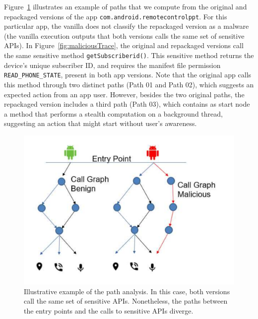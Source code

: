 Figure~\ref{fig:callGraph} illustrates an example of paths that we compute from the original and
repackaged versions of the app \texttt{com.android.remotecontrolppt}.
For this particular app, the vanilla \mas does not classify the repackaged version as a
malware (the vanilla \mas execution outputs that both versions calls the same set of sensitive APIs).
In Figure~\ref{fig:maliciousTrace}, the original and repackaged versions call the same
sensitive method \texttt{getSubscriberid()}. This sensitive method returns the device's unique
subscriber ID, and requires the manifest file permission \texttt{READ\_PHONE\_STATE}, present in both app versions.
Note that the original app calls this method through two distinct paths (Path 01 and Path 02), which suggests an expected action from an app user.
However, besides the two original paths, the repackaged version includes a third path (Path 03), which contains as start node a method
that performs a stealth computation on a background thread, suggesting an action that might start without
user's awareness.

\begin{figure}[ht]
\centering
\includegraphics[scale=0.30]{images/maliciousCallGraph.pdf}
\caption{Illustrative example of the path analysis. In this case, both versions call the same set of sensitive APIs. Nonetheless,
the paths between the entry points and the calls to sensitive APIs diverge.}
 \label{fig:callGraph}
\end{figure}

